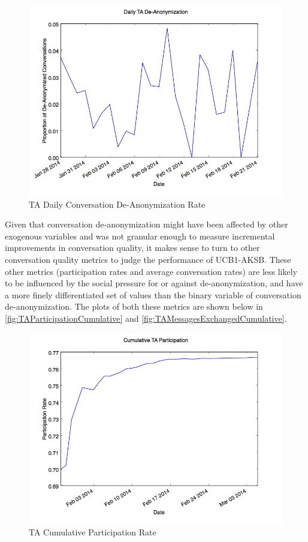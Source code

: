 \begin{figure}[H]
\centering
\includegraphics[trim= 0mm 0mm 0mm 0mm, clip, scale=0.5]{./Figures/DailyTADe-Anonymization.jpg}
\caption{TA Daily Conversation De-Anonymization Rate}
\label{fig:TADe-AnonymizationDaily}
\end{figure}

Given that conversation de-anonymization might have been affected by other exogenous variables and was not granular enough to measure incremental improvements in conversation quality, it makes sense to turn to other conversation quality metrics to judge the performance of UCB1-AKSB. These other metrics (participation rates and average conversation rates) are less likely to be influenced by the social pressure for or against de-anonymization, and have a more finely differentiated set of values than the binary variable of conversation de-anonymization. The plots of both these metrics are shown below in \autoref{fig:TAParticipationCumulative} and \autoref{fig:TAMessagesExchangedCumulative}.

\begin{figure}[H]
\centering
\includegraphics[trim= 0mm 0mm 0mm 0mm, clip, scale=0.5]{./Figures/CumulativeTAParticipation.jpg}
\caption{TA Cumulative Participation Rate}
\label{fig:TAParticipationCumulative}
\end{figure}

